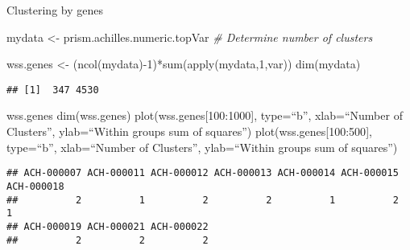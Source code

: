 \documentclass[
]{article}
\newenvironment{Shaded}{\begin{snugshade}}{\end{snugshade}}
\newcommand{\AttributeTok}[1]{\textcolor[rgb]{0.77,0.63,0.00}{#1}}
\newcommand{\CommentTok}[1]{\textcolor[rgb]{0.56,0.35,0.01}{\textit{#1}}}
\newcommand{\ControlFlowTok}[1]{\textcolor[rgb]{0.13,0.29,0.53}{\textbf{#1}}}
\newcommand{\DecValTok}[1]{\textcolor[rgb]{0.00,0.00,0.81}{#1}}
\newcommand{\FunctionTok}[1]{\textcolor[rgb]{0.00,0.00,0.00}{#1}}
\newcommand{\NormalTok}[1]{#1}
\newcommand{\OtherTok}[1]{\textcolor[rgb]{0.56,0.35,0.01}{#1}}
\newcommand{\SpecialCharTok}[1]{\textcolor[rgb]{0.00,0.00,0.00}{#1}}
\begin{document}
Clustering by genes

\begin{Shaded}
\begin{Highlighting}[]
\NormalTok{mydata }\OtherTok{\textless{}{-}}\NormalTok{ prism.achilles.numeric.topVar}
\CommentTok{\# Determine number of clusters}

\NormalTok{wss.genes }\OtherTok{\textless{}{-}}\NormalTok{ (}\FunctionTok{ncol}\NormalTok{(mydata)}\SpecialCharTok{{-}}\DecValTok{1}\NormalTok{)}\SpecialCharTok{*}\FunctionTok{sum}\NormalTok{(}\FunctionTok{apply}\NormalTok{(mydata,}\DecValTok{1}\NormalTok{,var))}
\FunctionTok{dim}\NormalTok{(mydata)}
\end{Highlighting}
\end{Shaded}

\begin{verbatim}
## [1]  347 4530
\end{verbatim}

\begin{Shaded}
\end{Shaded}

wss.genes dim(wss.genes) plot(wss.genes{[}100:1000{]}, type=``b'',
xlab=``Number of Clusters'', ylab=``Within groups sum of squares'')
plot(wss.genes{[}100:500{]}, type=``b'', xlab=``Number of Clusters'',
ylab=``Within groups sum of squares'')

\begin{Shaded}
\end{Shaded}

\begin{verbatim}
## ACH-000007 ACH-000011 ACH-000012 ACH-000013 ACH-000014 ACH-000015 ACH-000018 
##          2          1          2          2          1          2          1 
## ACH-000019 ACH-000021 ACH-000022 
##          2          2          2
\end{verbatim}
\end{document}
